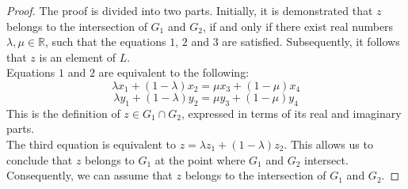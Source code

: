 \begin{proof}
    \leanok
    The proof is divided into two parts. Initially, it is demonstrated that $z$ belongs to the intersection of $G_1$ and $G_2$, if and only if there exist real numbers $\lambda, \mu \in \mathbb{R}$, such that the equations $1$, $2$ and $3$ are satisfied.
    Subsequently, it follows that $z$ is an element of $L$.\\
    Equations $1$ and $2$ are equivalent to the following:
    $$ \lambda x_1 + (1 - \lambda)x_2 = \mu x_3 + (1 - \mu)x_4 $$
    $$ \lambda y_1 + (1 - \lambda)y_2 = \mu y_3 + (1 - \mu)y_4 $$ 
    This is the definition of $z \in G_1 \cap G_2$, expressed in terms of its real and imaginary parts.\\
    The third equation is equivalent to $z = \lambda z_1 + (1 - \lambda)z_2$. This allows us to conclude that $z$ belongs to $G_1$ at the point where $G_1$ and $G_2$ intersect. 
    Consequently, we can assume that $z$ belongs to the intersection of $G_1$ and $G_2$.


\end{proof}
